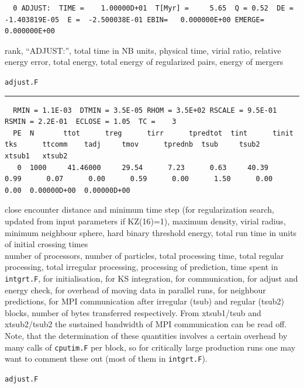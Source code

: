 \begin{landscape}
\vspace{1ex}
\noindent
\begin{minipage}[t]{18cm}
{\tiny
\begin{verbatim}
  0 ADJUST:  TIME =    1.00000D+01  T[Myr] =     5.65  Q = 0.52  DE =  -1.403819E-05  E =  -2.500038E-01 EBIN=   0.000000E+00 EMERGE=   0.000000E+00
\end{verbatim}
}
rank, ``ADJUST:'', total time in NB units, physical time,
virial ratio, relative energy error, total energy,
total energy of regularized pairs, energy of mergers
\end{minipage} \hfill
%
\begin{minipage}{4.5cm}
\begin{center}
{\tt adjust.F}
\end{center}
\end{minipage}

\vspace{1ex}
\noindent
\hrule


\vspace{1ex}
\noindent
\begin{minipage}[c]{18cm}
{\tiny
\begin{verbatim}
  RMIN = 1.1E-03  DTMIN = 3.5E-05 RHOM = 3.5E+02 RSCALE = 9.5E-01 RSMIN = 2.2E-01  ECLOSE = 1.05  TC =    3
  PE  N       ttot      treg      tirr      tpredtot  tint      tinit      tks      ttcomm    tadj     tmov      tprednb  tsub     tsub2    xtsub1   xtsub2
   0  1000     41.46000     29.54      7.23      0.63     40.39      0.99      0.07      0.00      0.59      0.00      1.50      0.00      0.00  0.00000D+00  0.00000D+00
\end{verbatim}
}
close encounter distance and minimum time step (for regularization search,
updated from input parameters if KZ(16)=1), maximum density, virial radius,
minimum neighbour sphere, hard binary threshold energy, 
total run time in units of initial crossing times\\
number of processors, number of particles, total processing time,
total regular processing, total irregular processing, processing of
prediction, time spent in {\tt intgrt.F}, for initialisation, for
KS integration, for communication, for adjust and energy check,
for overhead of moving data in parallel runs, for neighbour predictions,
for MPI communication after irregular (tsub) and regular (tsub2) blocks,
number of bytes transferred respectively. From xtsub1/tsub and xtsub2/tsub2
the sustained bandwidth of MPI communication can be read off.
Note, that the determination of these quantities involves a
certain overhead by many calls of {\tt cputim.F} per block,
so for critically large production runs one may want to comment
these out (most of them in {\tt intgrt.F}).
\end{minipage} \hfill
%
\begin{minipage}{4.5cm}
\begin{center}
{\tt adjust.F}
\end{center}
\end{minipage}


\end{landscape}
